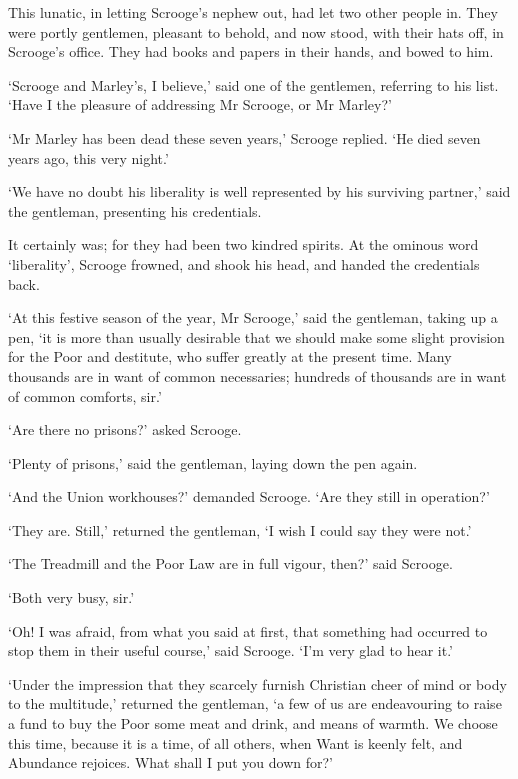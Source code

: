 \documentclass[11pt,twoside]{article}\makeatletter
\begin{document}
This lunatic, in letting Scrooge's nephew out, had let two other people in. They were portly gentlemen, pleasant to behold, and now stood, with their hats off, in Scrooge's office. They had books and papers in their hands, and bowed to him. \par
‘Scrooge and Marley's, I believe,’ said one of the gentlemen, referring to his list. ‘Have I the pleasure of addressing Mr Scrooge, or Mr Marley?’\par
‘Mr Marley has been dead these seven years,’ Scrooge replied. ‘He died seven years ago, this very night.’\par
‘We have no doubt his liberality is well represented by his surviving partner,’ said the gentleman, presenting his credentials.\par
It certainly was; for they had been two kindred spirits. At the ominous word ‘liberality’, Scrooge frowned, and shook his head, and handed the credentials back.\par
‘At this festive season of the year, Mr Scrooge,’ said the gentleman, taking up a pen, ‘it is more than usually desirable that we should make some slight provision for the Poor and destitute, who suffer greatly at the present time. Many thousands are in want of common necessaries; hundreds of thousands are in want of common comforts, sir.’\par
‘Are there no prisons?’ asked Scrooge.\par
‘Plenty of prisons,’ said the gentleman, laying down the pen again. \par
‘And the Union workhouses?’ demanded Scrooge. ‘Are they still in operation?’\par
‘They are. Still,’ returned the gentleman, ‘I wish I could say they were not.’\par
‘The Treadmill and the Poor Law are in full vigour, then?’ said Scrooge.\par
‘Both very busy, sir.’\par
‘Oh! I was afraid, from what you said at first, that something had occurred to stop them in their useful course,’ said Scrooge. ‘I'm very glad to hear it.’\par
‘Under the impression that they scarcely furnish Christian cheer of mind or body to the multitude,’ returned the gentleman, ‘a few of us are endeavouring to raise a fund to buy the Poor some meat and drink, and means of warmth. We choose this time, because it is a time, of all others, when Want is keenly felt, and Abundance rejoices. What shall I put you down for?’\par
\end{document}

